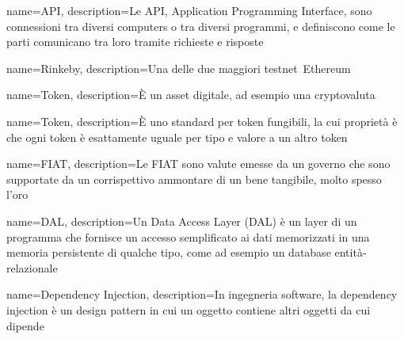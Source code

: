 {
  name={API},
  description={Le API, Application Programming Interface, sono connessioni tra diversi computers o tra diversi programmi, e definiscono come le parti comunicano tra loro tramite richieste e risposte}
}

{
  name={Rinkeby},
  description={Una delle due maggiori testnet\glo\ Ethereum}
}

{
  name={Token},
  description={È un asset digitale, ad esempio una cryptovaluta}
}

{
  name={Token},
  description={È uno standard per token fungibili, la cui proprietà è che ogni token è esattamente uguale per tipo e valore a un altro token}
}

{
  name={FIAT},
  description={Le FIAT sono valute emesse da un governo che sono supportate da un corrispettivo ammontare di un bene tangibile, molto spesso l'oro}
}

{
  name={DAL},
  description={Un Data Access Layer (DAL) è un layer di un programma che fornisce un accesso semplificato ai dati memorizzati in una memoria persistente di qualche tipo, come ad esempio un database entità-relazionale}
}

{
  name={Dependency Injection},
  description={In ingegneria software, la dependency injection è un design pattern in cui un oggetto contiene altri oggetti da cui dipende}
}